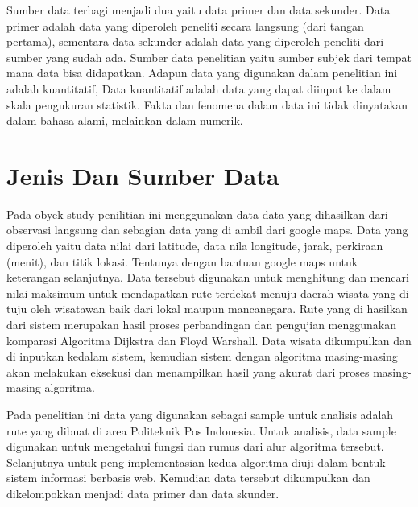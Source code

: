 Sumber data terbagi menjadi dua yaitu data primer dan data sekunder. Data primer adalah data yang diperoleh peneliti secara langsung (dari tangan pertama), sementara data sekunder adalah data yang diperoleh peneliti dari sumber yang sudah ada. Sumber data penelitian yaitu sumber subjek dari tempat mana data bisa didapatkan. Adapun data yang digunakan dalam penelitian ini adalah kuantitatif, Data kuantitatif adalah data yang dapat diinput ke dalam skala pengukuran statistik. Fakta dan fenomena dalam data ini tidak dinyatakan dalam bahasa alami, melainkan dalam numerik.





\section{Jenis Dan Sumber Data}
Pada obyek study penilitian ini menggunakan data-data yang dihasilkan dari observasi langsung dan sebagian data yang di ambil dari google maps. Data yang diperoleh yaitu data nilai dari latitude, data nila longitude, jarak, perkiraan (menit), dan titik lokasi. Tentunya dengan bantuan google maps untuk keterangan selanjutnya. Data tersebut digunakan untuk menghitung dan mencari nilai maksimum untuk mendapatkan rute terdekat menuju daerah wisata yang di tuju oleh wisatawan baik dari lokal maupun mancanegara. Rute yang di hasilkan dari sistem merupakan hasil proses perbandingan dan pengujian menggunakan komparasi Algoritma Dijkstra dan Floyd Warshall. Data wisata dikumpulkan dan di inputkan kedalam sistem, kemudian sistem dengan algoritma masing-masing akan melakukan eksekusi dan menampilkan hasil yang akurat dari proses masing-masing algoritma.

Pada penelitian ini data yang digunakan sebagai sample untuk analisis adalah rute yang dibuat di area Politeknik Pos Indonesia. Untuk analisis, data sample digunakan untuk mengetahui fungsi dan rumus dari alur algoritma tersebut. Selanjutnya untuk peng-implementasian kedua algoritma diuji dalam bentuk sistem informasi berbasis web. Kemudian data tersebut dikumpulkan dan dikelompokkan menjadi data primer dan data skunder.

